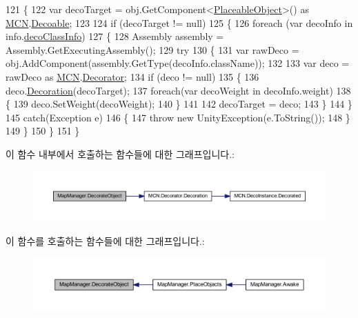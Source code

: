 \begin{DoxyCode}
121     \{
122         var decoTarget = obj.GetComponent<\hyperlink{class_placeable_object}{PlaceableObject}>() as 
      \hyperlink{namespace_m_c_n}{MCN}.\hyperlink{class_m_c_n_1_1_decoable}{Decoable};
123 
124         if (decoTarget != null)
125         \{
126             \textcolor{keywordflow}{foreach} (var decoInfo \textcolor{keywordflow}{in} info.\hyperlink{class_m_c_n_1_1_place_info_a52b0fe979b2c0403be64f1f42262e086}{decoClassInfo})
127             \{
128                 Assembly assembly = Assembly.GetExecutingAssembly();
129                 \textcolor{keywordflow}{try}
130                 \{
131                     var rawDeco = obj.AddComponent(assembly.GetType(decoInfo.className));
132 
133                     var deco = rawDeco as \hyperlink{namespace_m_c_n}{MCN}.\hyperlink{class_m_c_n_1_1_decorator}{Decorator};
134                     \textcolor{keywordflow}{if} (deco != null)
135                     \{
136                         deco.\hyperlink{class_m_c_n_1_1_decorator_ab82c83f62182a25a72dc81530c743c32}{Decoration}(decoTarget);
137                         \textcolor{keywordflow}{foreach}(var decoWeight \textcolor{keywordflow}{in} decoInfo.weight)
138                         \{
139                             deco.SetWeight(decoWeight);
140                         \}
141 
142                         decoTarget = deco;
143                     \}
144                 \}
145                 \textcolor{keywordflow}{catch}(Exception e)
146                 \{
147                     \textcolor{keywordflow}{throw} \textcolor{keyword}{new} UnityException(e.ToString());
148                 \}
149             \}
150         \}
151     \}
\end{DoxyCode}


이 함수 내부에서 호출하는 함수들에 대한 그래프입니다.\+:\nopagebreak
\begin{figure}[H]
\begin{center}
\leavevmode
\includegraphics[width=350pt]{class_map_manager_a31c2b0b9cf8f208a596b65e7f1d88873_cgraph}
\end{center}
\end{figure}




이 함수를 호출하는 함수들에 대한 그래프입니다.\+:\nopagebreak
\begin{figure}[H]
\begin{center}
\leavevmode
\includegraphics[width=350pt]{class_map_manager_a31c2b0b9cf8f208a596b65e7f1d88873_icgraph}
\end{center}
\end{figure}


